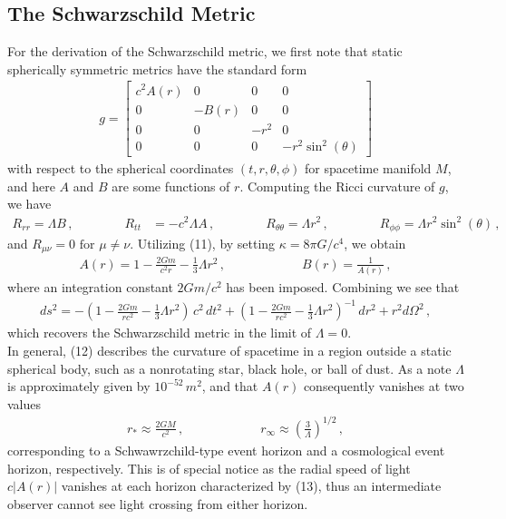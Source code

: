 \documentclass[11pt, onesided]{book}
\theoremstyle{break}
\theoremstyle{break}
\newcommand{\bmat}[1]{\begin{bmatrix} #1 \end{bmatrix}}
\begin{document}
\subsection{The Schwarzschild Metric}
For the derivation of the Schwarzschild metric, we first note that static spherically symmetric metrics have the standard form
\begin{align*}
g = \bmat{c^2 A(r) & 0& 0&0\\
0 & -B(r) & 0& 0\\
0 & 0& -r^2 &0\\
0 & 0 & 0& -r^2 \sin^2(\theta)}
\end{align*}
with respect to the spherical coordinates $(t, r,\theta,\phi)$ for spacetime manifold $M$, and here $A$ and $B$ are some functions of $r$. Computing the Ricci curvature of $g$, we have
\begin{align*}
R_{rr} = \Lambda B\,, \qquad\qquad R_{tt} &= -c^2 \Lambda A\,, \qquad\qquad R_{\theta\theta} = \Lambda r^2\,,\qquad\qquad
R_{\phi\phi} = \Lambda r^2 \sin^2(\theta) \,,
\end{align*}
and $R_{\mu\nu} = 0 \text{ for }\mu \neq \nu$. Utilizing (11), by setting $\kappa = 8\pi G/c^4$, we obtain
\begin{align*}
A(r) = 1- \frac{2Gm}{c^2 r} - \frac{1}{3}\Lambda r^2 \,,\qquad\qquad\qquad B(r) = \frac{1}{A(r)}\,,
\end{align*}
where an integration constant $2Gm/c^2$ has been imposed. Combining we see that
\begin{align}
ds^2 = -\left( 1 - \frac{2Gm}{rc^2}- \frac{1}{3}\Lambda r^2\right)\, c^2 \, dt^2 + \left( 1 - \frac{2Gm}{rc^2}-\frac{1}{3}\Lambda r^2 \right)^{-1} \, dr^2 + r^2 d\Omega^2\,,
\end{align}
which recovers the Schwarzschild metric in the limit of $\Lambda = 0$. \\

In general, (12) describes the curvature of spacetime in a region outside a static spherical body, such as a nonrotating star, black hole, or ball of dust. As a note $\Lambda$ is approximately given by $10^{-52}\, m^2$, and that $A(r)$ consequently vanishes at two values
\begin{align}
r_* \approx \frac{2GM}{c^2}\,, \qquad\qquad\qquad r_\infty \approx \left( \frac{3}{\Lambda}\right)^{1/2}\,,
\end{align}
corresponding to a Schwawrzchild-type event horizon and a cosmological event horizon, respectively. This is of special notice as the radial speed of light $c|A(r)|$ vanishes at each horizon characterized by (13), thus an intermediate observer cannot see light crossing from either horizon.\\
\end{document}
